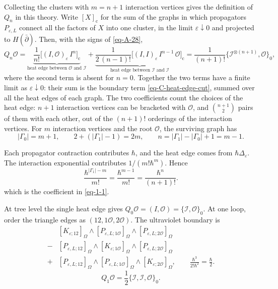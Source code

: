 \documentclass[11pt]{article}
\numberwithin{equation}{section}
\numberwithin{figure}{section}
\numberwithin{table}{section}
\begin{document}
Collecting the clusters with $m=n+1$ interaction vertices gives the definition of $Q_n$ in this theory. Write $[X]_{\mathrm{c}}$ for the sum of the graphs in which propagators $P_{\varepsilon,L}$ connect all the factors of $X$ into one cluster, in the limit $\varepsilon\downarrow0$ and projected to $H(\bar\partial)$. Then, with the signs of \eqref{eq-A-28},
\begin{equation}\label{eq-C-Qn-definition}
Q_n\mathcal O
=\underbrace{\frac1{n!}\bigl[(I,\mathcal O)_\varepsilon\,I^{n}\bigr]_{\mathrm c}}_{\text{heat edge between }\mathcal O\text{ and }\mathcal I}
+\underbrace{\frac1{2\,(n-1)!}\bigl[(I,I)_\varepsilon\,I^{n-1}\,\mathcal O\bigr]_{\mathrm c}}_{\text{heat edge between }\mathcal I\text{ and }\mathcal I}
=\frac1{(n+1)!}\{\mathcal I^{\otimes(n+1)},\mathcal O\}_0 ,
\end{equation}
where the second term is absent for $n=0$. Together the two terms have a finite limit as $\varepsilon\downarrow0$: their sum is the boundary term \eqref{eq-C-heat-edge-cut}, summed over all the heat edges of each graph. The two coefficients count the choices of the heat edge: $n+1$ interaction vertices can be bracketed with $\mathcal O$, and $\binom{n+1}{2}$ pairs of them with each other, out of the $(n+1)!$ orderings of the interaction vertices. For $m$ interaction vertices and the root $\mathcal O$, the surviving graph has
\begin{equation}\label{eq-C-loop-count}
|\Gamma_0|=m+1,\qquad
2+(|\Gamma_1|-1)=2m,\qquad
n=|\Gamma_1|-|\Gamma_0|+1=m-1.
\end{equation}

Each propagator contraction contributes $\hbar$, and the heat edge comes from $\hbar\Delta_\varepsilon$. The interaction exponential contributes $1/(m!\hbar^m)$. Hence
\begin{equation}\label{eq-C-loop-weight}
\frac{\hbar^{|\Gamma_1|-m}}{m!}
=\frac{\hbar^{m-1}}{m!}
=\frac{\hbar^n}{(n+1)!}.
\end{equation}
which is the coefficient in \eqref{eq-1-1}.

At tree level the single heat edge gives $Q_0\mathcal O=(I,\mathcal O)=\{\mathcal I,\mathcal O\}_0$. At one loop, order the triangle edges as $(12,1\mathcal O,2\mathcal O)$. The ultraviolet boundary is
\begin{equation*}
\begin{aligned}
 &[K_{\varepsilon;12}]_\Omega\wedge[P_{\varepsilon,L;1\mathcal O}]_\Omega
       \wedge[P_{\varepsilon,L;2\mathcal O}]_\Omega\\
-&[P_{\varepsilon,L;12}]_\Omega\wedge[K_{\varepsilon;1\mathcal O}]_\Omega
       \wedge[P_{\varepsilon,L;2\mathcal O}]_\Omega\\
+&[P_{\varepsilon,L;12}]_\Omega\wedge[P_{\varepsilon,L;1\mathcal O}]_\Omega
       \wedge[K_{\varepsilon;2\mathcal O}]_\Omega,
\qquad
\frac{\hbar^3}{2!\hbar^2}=\frac\hbar2.
\end{aligned}
\end{equation*}
\begin{equation*}
Q_1\mathcal O=\frac12\{\mathcal I,\mathcal I,\mathcal O\}_0.
\end{equation*}
\end{document}
